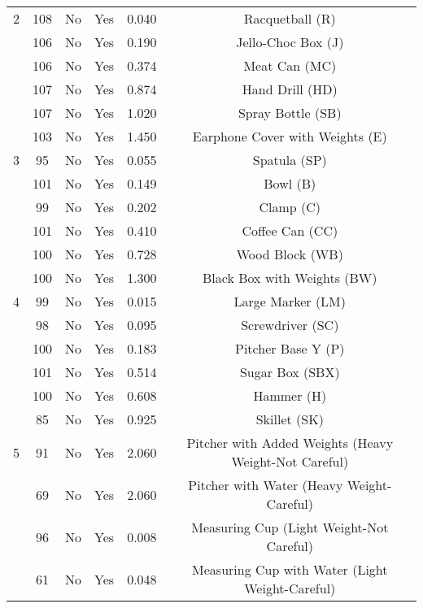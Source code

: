 \begin{table*}[t]
\begin{tabular}{|l|c|c|c|c|c|}
2 & 108 & No & Yes & 0.040 & Racquetball (R) \\ 
  & 106    & No & Yes & 0.190 & Jello-Choc Box (J) \\ 
  & 106    & No & Yes & 0.374 & Meat Can (MC) \\ 
  & 107   & No & Yes & 0.874 & Hand Drill (HD) \\ 
  & 107    & No & Yes & 1.020 & Spray Bottle (SB) \\ 
  & 103    & No & Yes & 1.450 & Earphone Cover with Weights (E) \\ \hline
3 & 95 & No & Yes & 0.055 & Spatula (SP) \\ 
  & 101  & No & Yes & 0.149 & Bowl (B) \\ 
  & 99  & No & Yes & 0.202 & Clamp (C) \\ 
  & 101  & No & Yes & 0.410 & Coffee Can (CC) \\ 
  & 100  & No & Yes & 0.728 & Wood Block (WB) \\ 
  & 100  & No & Yes & 1.300 & Black Box with Weights (BW) \\ \hline
4 & 99 & No & Yes & 0.015 & Large Marker (LM) \\ 
  & 98 & No & Yes & 0.095 & Screwdriver (SC) \\ 
  & 100 & No & Yes & 0.183 & Pitcher Base Y (P) \\ 
  & 101 & No & Yes & 0.514 & Sugar Box (SBX) \\ 
  & 100 & No & Yes & 0.608 & Hammer (H) \\ 
  & 85 & No & Yes & 0.925 & Skillet (SK) \\ \hline
5 & 91 & No & Yes & 2.060 & Pitcher with Added Weights (Heavy Weight-Not Careful) \\ 
  & 69 & No & Yes & 2.060 & Pitcher with Water (Heavy Weight-Careful) \\ 
  & 96 & No & Yes & 0.008 & Measuring Cup (Light Weight-Not Careful) \\ 
  & 61 & No & Yes & 0.048 & Measuring Cup with Water (Light Weight-Careful) \\ \hline
\end{tabular}
\label{tab:handover_summary}
\end{table*}


